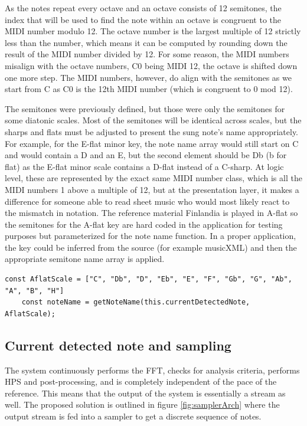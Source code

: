 As the notes repeat every octave and an octave consists of 12 semitones, the index that will be used to find the note within an octave is congruent to the MIDI number modulo 12. The octave number is the largest multiple of 12 strictly less than the number, which means it can be computed by rounding down the result of the MIDI number divided by 12. For some reason, the MIDI numbers misalign with the octave numbers, C0 being MIDI 12, the octave is shifted down one more step. The MIDI numbers, however, do align with the semitones as we start from C as C0 is the 12th MIDI number (which is congruent to 0 mod 12).



The semitones were previously defined, but those were only the semitones for some diatonic scales. Most of the semitones will be identical across scales, but the sharps and flats must be adjusted to present the sung note's name appropriately. For example, for the E-flat minor key, the note name array would still start on C and would contain a D and an E, but the second element should be Db (b for flat) as the E-flat minor scale contains a D-flat instead of a C-sharp. At logic level, these are represented by the exact same MIDI number class, which is all the MIDI numbers 1 above a multiple of 12, but at the presentation layer, it makes a difference for someone able to read sheet music who would most likely react to the mismatch in notation. The reference material Finlandia is played in A-flat so the semitones for the A-flat key are hard coded in the application for testing purposes but parameterized for the note name function. In a proper application, the key could be inferred from the source (for example musicXML) and then the appropriate semitone name array is applied.

\begin{lstlisting}[style=javascript]
    const AflatScale = ["C", "Db", "D", "Eb", "E", "F", "Gb", "G", "Ab", "A", "B", "H"]
    const noteName = getNoteName(this.currentDetectedNote, AflatScale);
\end{lstlisting}

\subsection{Current detected note and sampling}
The system continuously performs the FFT, checks for analysis criteria, performs HPS and post-processing, and is completely independent of the pace of the reference. This means that the output of the system is essentially a stream as well. The proposed solution is outlined in figure \ref{fig:samplerArch} where the output stream is fed into a sampler to get a discrete sequence of notes. 

